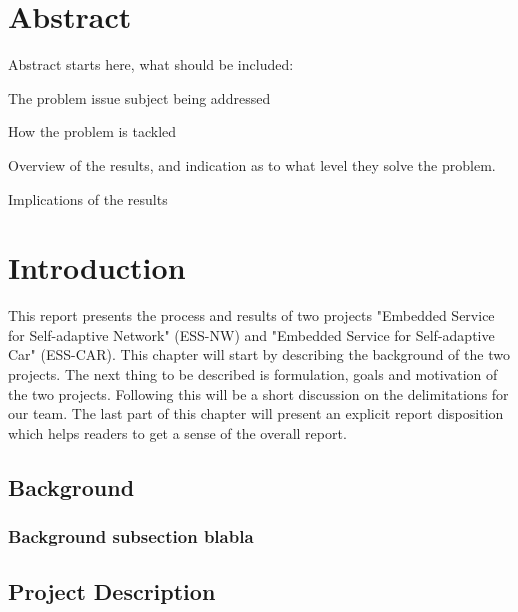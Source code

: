 \documentclass[11pt, titlepage]{article} %
\begin{document}

\clearpage
\section*{Abstract}
Abstract starts here,
what should be included:

The problem issue subject being addressed

How the problem is tackled

Overview of the results, and indication as to what level they solve the problem.

Implications of the results
\clearpage
\clearpage
\tableofcontents
\clearpage
\clearpage
\listoffigures
\clearpage
\clearpage
\listoftables
\clearpage
\clearpage
\section{Introduction}
This report presents the process and results of two projects "Embedded Service for Self-adaptive Network" (ESS-NW) and "Embedded Service for Self-adaptive Car" (ESS-CAR). This chapter will start by describing the background of the two projects. The next thing to be described is formulation, goals and motivation of the two projects. Following this will be a short discussion on the delimitations for our team. The last part of this chapter will present an explicit report disposition which helps readers to get a sense of the overall report.

\subsection{Background}

\subsubsection{Background subsection blabla}

\subsection{Project Description}
\end{document}
